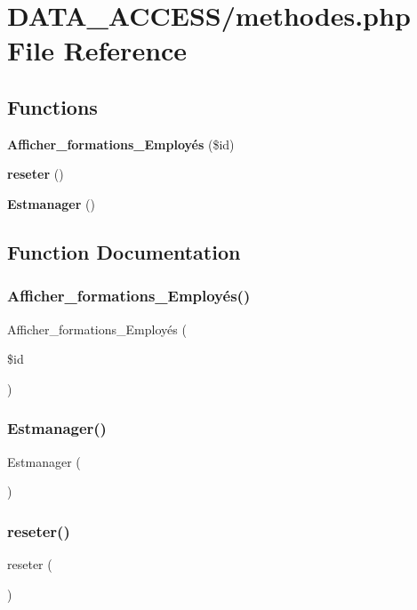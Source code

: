 \section{D\+A\+T\+A\+\_\+\+A\+C\+C\+E\+S\+S/methodes.php File Reference}
\label{methodes_8php}
\subsection*{Functions}
\begin{DoxyCompactItemize}
\item 
\textbf{ Afficher\+\_\+formations\+\_\+\+Employés} (\$id)
\item 
\textbf{ reseter} ()
\item 
\textbf{ Estmanager} ()
\end{DoxyCompactItemize}


\subsection{Function Documentation}
\mbox{\label{methodes_8php_a767941f1145027035be872ae79e50a0c}} 
\subsubsection{Afficher\+\_\+formations\+\_\+\+Employés()}
{\footnotesize\ttfamily Afficher\+\_\+formations\+\_\+\+Employés (\begin{DoxyParamCaption}\item[{}]{\$id }\end{DoxyParamCaption})}

\mbox{\label{methodes_8php_a9a319be4735262033f28f3619f3f74d2}} 
\subsubsection{Estmanager()}
{\footnotesize\ttfamily Estmanager (\begin{DoxyParamCaption}{ }\end{DoxyParamCaption})}

\mbox{\label{methodes_8php_a3dfb4ffad0f50d3c9d37d83451e7fd73}} 
\subsubsection{reseter()}
{\footnotesize\ttfamily reseter (\begin{DoxyParamCaption}{ }\end{DoxyParamCaption})}

